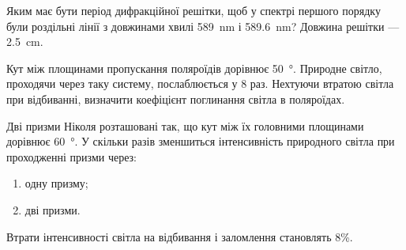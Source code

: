 \documentclass[a4paper,oneside,DIV=10,12pt]{scrartcl}
\begin{document}
	\begin{solution}
	\end{solution}
	
	\begin{exercise}
		Яким має бути період дифракційної решітки, щоб у спектрі першого порядку були роздільні лінії з довжинами хвилі \SI{589}{\nano\metre} і \SI{589.6}{\nano\metre}? Довжина решітки — \SI{2.5}{\centi\metre}.
	\end{exercise}
	
	\begin{solution}
	\end{solution}
	
	\begin{exercise}
		Кут між площинами пропускання поляроїдів дорівнює \SI{50}{\degree}. Природне світло, проходячи через таку систему, послаблюється у 8 раз. Нехтуючи втратою світла при відбиванні, визначити коефіцієнт поглинання світла в поляроїдах.
	\end{exercise}
	
	\begin{solution}
	\end{solution}
	
	\begin{exercise}
		Дві призми Ніколя розташовані так, що кут між їх головними площинами дорівнює \SI{60}{\degree}. У скільки разів зменшиться інтенсивність природного світла при проходженні призми через:
		\begin{enumerate}
			\item одну призму;
			\item дві призми.
		\end{enumerate}
		Втрати інтенсивності світла на відбивання і заломлення становлять 8\%.
	\end{exercise}
	
	\begin{solution}
	\end{solution}
	
	\begin{exercise}
		
	\end{exercise}
	
	\begin{solution}
	\end{solution}
\end{document}
